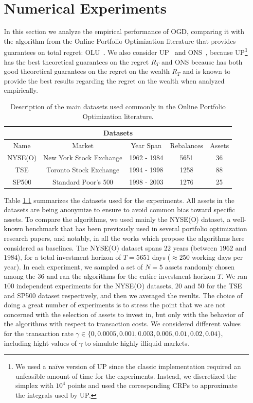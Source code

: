 \chapter{Numerical Experiments} 
\label{ch:experiments}

In this section we analyze the empirical performance of OGD, comparing it with the algorithm from the Online Portfolio Optimization literature that provides guarantees on total regret: OLU~\cite{das2013online}.
We also consider UP~\cite{cover1996universal} and ONS~\cite{agarwal2006algorithms}, because UP\footnote{
We used a na\"ive version of UP since the classic implementation required an unfeasible amount of time for the experiments.
Instead, we discretized the simplex with $10^4$ points and used the corresponding CRPs to approximate the integrals used by UP.} has the best theoretical guarantees on the regret $R_T$ and ONS because has both good theoretical guarantees on the regret on the wealth $R_T$ and is known to provide the best results regarding the regret on the wealth when analyzed empirically.

\begin{table}[ht!]\centering
\begin{tabular}{ |c||c|c|c|c| }
 \hline
 \multicolumn{5}{|c|}{Datasets} \\
 \hline
 Name & Market &Year Span & Rebalances & Assets\\
 \hline
 NYSE(O) & New York Stock Exchange  & 1962 - 1984  &5651&   36\\
 TSE & Toronto Stock Exchange & 1994 - 1998  & 1258   &88\\
 SP500 & Standard Poor's 500 & 1998 - 2003 & 1276&  25\\
 \hline
\end{tabular}
\caption{Description of the main datasets used commonly in the Online Portfolio Optimization literature.}\label{tab:dataset}
\end{table}

Table \ref{tab:dataset} summarizes the datasets used for the experiments. All assets in the datasets are being anonymize to ensure to avoid common bias toward specific assets.
To compare the algorithms, we used mainly the NYSE(O) dataset, a well-known benchmark that has been previously used in several portfolio optimization research papers, and notably, in all the works which propose the algorithms here considered as baselines.
The NYSE(O) dataset spans $22$ years (between $1962$ and $1984$), for a total investment horizon of $T = 5651$ days ($\approx250$ working days per year).
In each experiment, we sampled a set of $N=5$ assets randomly chosen among the $36$ and ran the algorithms for the entire investment horizon $T$.
We ran $100$ independent experiments for the NYSE(O) datasets, $20$ and $50$ for the TSE and SP500 dataset respectively, and then we averaged the results. The choice of doing a great number of experiments is to stress the point that we are not concerned with the selection of assets to invest in, but only with the behavior of the algorithms with respect to transaction costs.
We considered different values for the transaction rate $\gamma \in \{ 0, 0.0005, 0.001, 0.003, 0.006, 0.01, 0.02, 0.04 \}$, including hight values of $\gamma$ to simulate highly illiquid markets.

